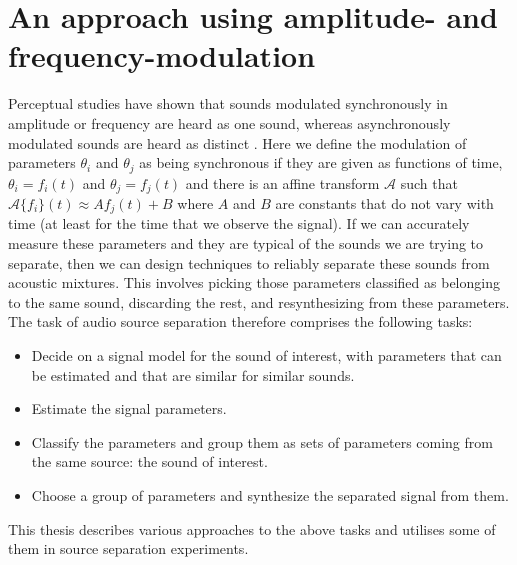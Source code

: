 \section{An approach using amplitude- and frequency-modulation}

Perceptual studies have shown that sounds modulated synchronously in amplitude
or frequency are heard as one sound, whereas asynchronously modulated sounds are
heard as distinct \cite{mcadams1989segregation} \cite{marin1991segregation}.
Here we define the modulation of parameters $\theta_i$ and $\theta_j$ as being
synchronous if they are given as functions of time, $\theta_i=f_i(t)$ and
$\theta_j=f_j(t)$ and there is an affine transform $\mathscr{A}$ such that
$\mathscr{A}\{f_i\}(t) \approx A f_j(t) + B$ where $A$ and $B$ are constants
that do not vary with time (at least for the time that we observe the signal).
If we can accurately measure these parameters and they are typical of the sounds
we are trying to separate, then we can design techniques to reliably separate
these sounds from acoustic mixtures. This involves picking those parameters
classified as belonging to the same sound, discarding the rest, and
resynthesizing from these parameters. The task of audio source separation
therefore comprises the following tasks:

\begin{itemize}
    \item
        Decide on a signal model for the sound of interest, with parameters that
        can be estimated and that are similar for similar sounds.
    \item
        Estimate the signal parameters.
    \item
        Classify the parameters and group them as sets of parameters coming from
        the same source: the sound of interest.
    \item
        Choose a group of parameters and synthesize the separated signal from
        them.
\end{itemize}

This thesis describes various approaches to the above tasks and utilises some of
them in source separation experiments.

